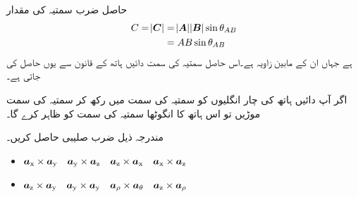 حاصل ضرب سمتیہ  کی مقدار
\begin{gather}
\begin{aligned}
C=\abs{\kvec{C}} &= \abs {\kvec{A}} \abs{\kvec{B}} \sin \theta_{AB}\\
&=A B \sin \theta_{AB}
\end{aligned}
\end{gather}
ہے جہاں  ان کے مابین زاویہ ہے۔اس حاصل سمتیہ کی سمت دائیں ہاتھ  کے قانون سے یوں حاصل کی جاتی ہے۔ 

اگر آپ دائیں ہاتھ کی چار انگلیوں کو سمتیہ  کی سمت میں رکھ کر  سمتیہ کی سمت موڑیں تو اس ہاتھ کا انگوٹھا   سمتیہ کی سمت کو ظاہر کرے گا۔

مندرجہ ذیل ضرب صلیبی حاصل کریں۔
\begin{itemize}
\item
$\ax \times \ay \quad \ay \times \az \quad \az \times \ax \quad \ax \times \az$ \\
\item
 $\az \times \ay \quad \ay \times \ay \quad \arho \times \atheta \quad \az \times \arho$
\end{itemize}

